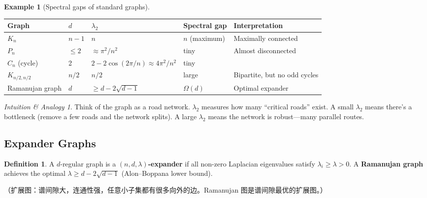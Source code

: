 \documentclass[12pt]{article}
\theoremstyle{definition}
\newtheorem{definition}[theorem]{Definition}
\newtheorem{example}[theorem]{Example}
\theoremstyle{remark}
\newtheorem{intuition}[theorem]{Intuition \& Analogy}
\begin{document}
\begin{example}[Spectral gaps of standard graphs]
\leavevmode
\begin{center}
\renewcommand{\arraystretch}{1.3}
\begin{tabular}{lllll}
\toprule
Graph & $d$ & $\lambda_2$ & Spectral gap & Interpretation \\
\midrule
$K_n$ & $n-1$ & $n$ & $n$ (maximum) & Maximally connected \\
$P_n$ & $\le 2$ & $\approx \pi^2/n^2$ & tiny & Almost disconnected \\
$C_n$ (cycle) & 2 & $2-2\cos(2\pi/n) \approx 4\pi^2/n^2$ & tiny & \\
$K_{n/2,n/2}$ & $n/2$ & $n/2$ & large & Bipartite, but no odd cycles \\
Ramanujan graph & $d$ & $\ge d - 2\sqrt{d-1}$ & $\Omega(d)$ & Optimal expander \\
\bottomrule
\end{tabular}
\end{center}
\end{example}

\begin{intuition}
Think of the graph as a road network.  $\lambda_2$ measures how many ``critical roads''
exist.  A small $\lambda_2$ means there's a bottleneck (remove a few roads and the
network splits).  A large $\lambda_2$ means the network is robust---many parallel routes.
\end{intuition}

\subsection{Expander Graphs}

\begin{definition}
A $d$-regular graph is a \textbf{$(n, d, \lambda)$-expander} if all non-zero Laplacian eigenvalues
satisfy $\lambda_i \ge \lambda > 0$.
A \textbf{Ramanujan graph} achieves the optimal $\lambda \ge d - 2\sqrt{d-1}$
(Alon--Boppana lower bound).
\end{definition}

\begin{CJK}{UTF8}{gbsn}
（扩展图：谱间隙大，连通性强，任意小子集都有很多向外的边。Ramanujan 图是谱间隙最优的扩展图。）
\end{CJK}
\end{document}

